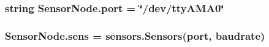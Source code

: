 \subsubsection[{\texorpdfstring{port}{port}}]{\setlength{\rightskip}{0pt plus 5cm}string Sensor\+Node.\+port = \char`\"{}/dev/tty\+A\+M\+A0\char`\"{}}\hypertarget{namespaceSensorNode_a1a9ff3aa5a94fc55ff0fa24862db071b}{}\label{namespaceSensorNode_a1a9ff3aa5a94fc55ff0fa24862db071b}
\subsubsection[{\texorpdfstring{sens}{sens}}]{\setlength{\rightskip}{0pt plus 5cm}Sensor\+Node.\+sens = {\bf sensors.\+Sensors}({\bf port}, {\bf baudrate})}\hypertarget{namespaceSensorNode_a341717027383e08a67cc397e2d00a99e}{}\label{namespaceSensorNode_a341717027383e08a67cc397e2d00a99e}

